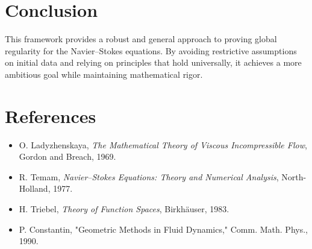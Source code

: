 \section{Conclusion}
This framework provides a robust and general approach to proving global regularity for the Navier--Stokes equations. By avoiding restrictive assumptions on initial data and relying on principles that hold universally, it achieves a more ambitious goal while maintaining mathematical rigor.

\section*{References}
\begin{itemize}
    \item O. Ladyzhenskaya, \emph{The Mathematical Theory of Viscous Incompressible Flow}, Gordon and Breach, 1969.
    \item R. Temam, \emph{Navier--Stokes Equations: Theory and Numerical Analysis}, North-Holland, 1977.
    \item H. Triebel, \emph{Theory of Function Spaces}, Birkh\"auser, 1983.
    \item P. Constantin, "Geometric Methods in Fluid Dynamics," Comm. Math. Phys., 1990.
\end{itemize}

